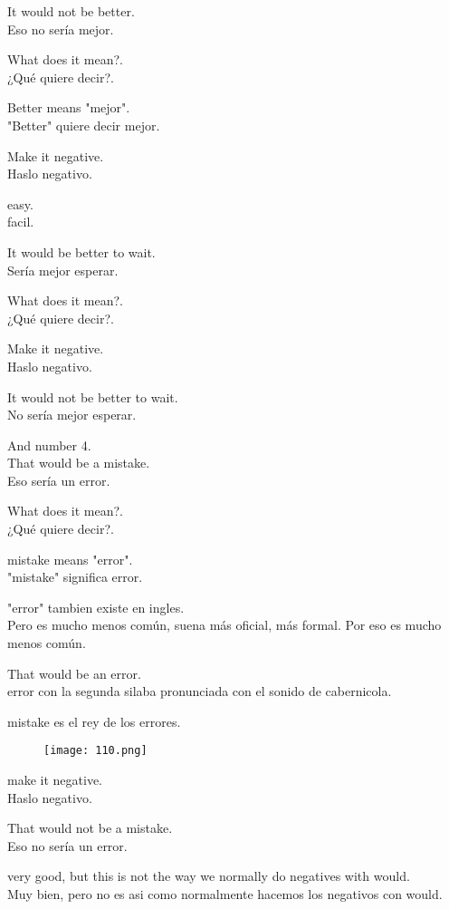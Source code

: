 It would not be better.\\
Eso no sería mejor.

What does it mean?.\\
¿Qué quiere decir?.

Better means "mejor".\\
"Better" quiere decir mejor.

Make it negative.\\
Haslo negativo.

easy.\\
facil.

It would be better to wait.\\
Sería mejor esperar.

What does it mean?.\\
¿Qué quiere decir?.

Make it negative.\\
Haslo negativo.

It would not be better to wait.\\
No sería mejor esperar.

And number 4.\\
That would be a mistake.\\
Eso sería un error.

What does it mean?.\\
¿Qué quiere decir?.

mistake means "error".\\
"mistake" significa error.

"error" tambien existe en ingles.\\
Pero es mucho menos común, suena más oficial,
más formal. Por eso es mucho menos común.

That would be an error.\\
error con la segunda silaba pronunciada
con el sonido de cabernicola.

mistake es el rey de los errores.\\

\begin{figure}[H]
\centering
\texttt{[image: 110.png]}
\end{figure}

make it negative.\\
Haslo negativo.

That would not be a mistake.\\
Eso no sería un error.

very good, but this is not the way we normally
do negatives with would.\\
Muy bien, pero no es asi como normalmente hacemos
los negativos con would.

